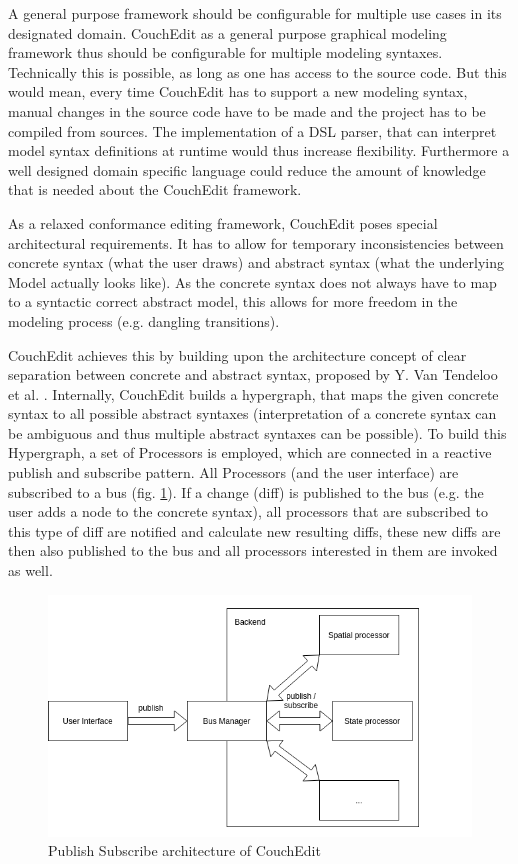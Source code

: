 \documentclass[10pt,a4paper,oneside]{scrartcl}
\begin{document}


A general purpose framework should be configurable for multiple use cases in its designated domain. CouchEdit as a general purpose graphical modeling framework thus should be configurable for multiple modeling syntaxes. Technically this is possible, as long as one has access to the source code. But this would mean, every time CouchEdit has to support a new modeling syntax, manual changes in the source code have to be made and the project has to be compiled from sources. The implementation of a DSL parser, that can interpret model syntax definitions at runtime would thus increase flexibility. Furthermore a well designed domain specific language could reduce the amount of knowledge that is needed about the CouchEdit framework.

As a relaxed conformance editing framework, CouchEdit poses special architectural requirements. It has to allow for temporary inconsistencies between concrete syntax (what the user draws) and abstract syntax (what the underlying Model actually looks like). As the concrete syntax does not always have to map to a syntactic correct abstract model, this allows for more freedom in the modeling process (e.g. dangling transitions).

CouchEdit achieves this by building upon the architecture concept of clear separation between concrete and abstract syntax, proposed by Y. Van Tendeloo et al. \cite{van_tendeloo_concrete_2017}. Internally, CouchEdit builds a hypergraph, that maps the given concrete syntax to all possible abstract syntaxes (interpretation of a concrete syntax can be ambiguous and thus multiple abstract syntaxes can be possible). To build this Hypergraph, a set of Processors is employed, which are connected in a reactive publish and subscribe pattern. All Processors (and the user interface) are subscribed to a bus (fig. \ref{fig:processors}). If a change (diff) is published to the bus (e.g. the user adds a node to the concrete syntax), all processors that are subscribed to this type of diff are notified and calculate new resulting diffs, these new diffs are then also published to the bus and all processors interested in them are invoked as well.

\begin{figure}
  \label{fig:processors}
  \centering
  \includegraphics[width=.6\linewidth]{./couchedit-processors}
  \caption{Publish Subscribe architecture of CouchEdit}
\end{figure}
\end{document}
